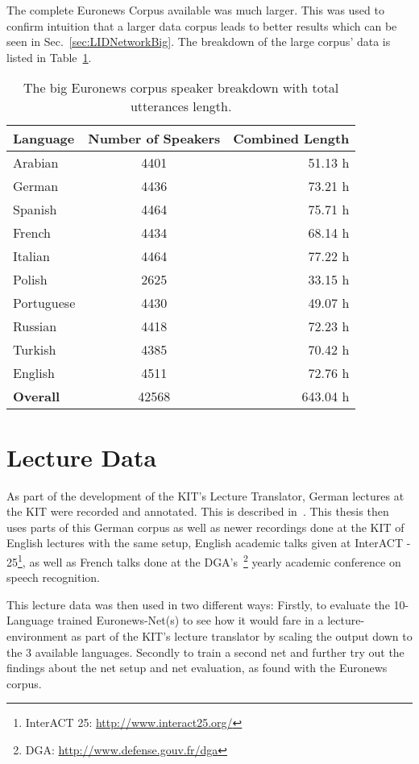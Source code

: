 The complete Euronews Corpus available was much larger. This was used to confirm intuition that a larger data corpus leads to better results which can be seen in Sec.~\ref{sec:LIDNetworkBig}. The breakdown of the large corpus' data is listed in Table~\ref{tab:spkDataBig}.

\begin{table}[h!]
\label{tab:spkDataBig}
\centering
\begin{tabular}{| l | c | r | }
	\hline
	\textbf{Language} & \textbf{Number of Speakers} & \textbf{Combined Length} \\
	\hline
	Arabian & 4401 & 51.13 h \\
	German & 4436 & 73.21 h \\
	Spanish & 4464 & 75.71 h \\
	French & 4434 & 68.14 h \\  
	Italian & 4464 & 77.22 h \\  
	Polish & 2625 & 33.15 h \\ 
	Portuguese & 4430 & 49.07 h \\ 
	Russian & 4418 & 72.23 h \\ 
	Turkish & 4385 & 70.42 h \\  
	English & 4511 & 72.76 h \\ 
	\hline
	\textbf{Overall} & 42568 & 643.04 h\\
	\hline
	
\end{tabular}
\caption{The big Euronews corpus speaker breakdown with total utterances length.}
\end{table}

\newpage
\section{Lecture Data}
\label{sec:LITasks:Lecture}

As part of the development of the KIT's Lecture Translator, German lectures at the KIT were recorded and annotated. This is described in~\cite{stuker2012kit}. This thesis then uses parts of this German corpus as well as newer recordings done at the KIT of English lectures with the same setup, English academic talks given at InterACT - 25\footnote{InterACT 25: \url{http://www.interact25.org/}}, as well as French talks done at the DGA's~\footnote{DGA: \url{http://www.defense.gouv.fr/dga}} yearly academic conference on speech recognition.

This lecture data was then used in two different ways: Firstly, to evaluate the 10-Language trained Euronews-Net(s) to see how it would fare in a lecture-environment as part of the KIT's lecture translator by scaling the output down to the 3 available languages. Secondly to train a second net and further try out the findings about the net setup and net evaluation, as found with the Euronews corpus.

